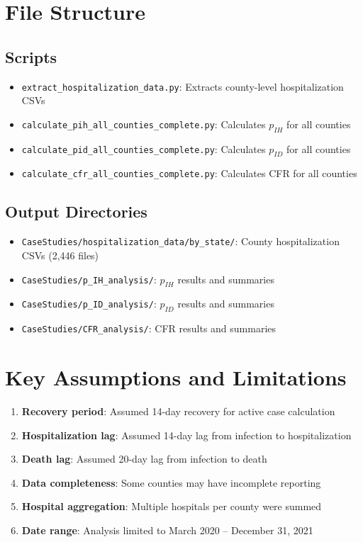 \documentclass[11pt]{article}
\begin{document}
\section{File Structure}

\subsection{Scripts}
\begin{itemize}
    \item \texttt{extract\_hospitalization\_data.py}: Extracts county-level hospitalization CSVs
    \item \texttt{calculate\_pih\_all\_counties\_complete.py}: Calculates $p_{IH}$ for all counties
    \item \texttt{calculate\_pid\_all\_counties\_complete.py}: Calculates $p_{ID}$ for all counties
    \item \texttt{calculate\_cfr\_all\_counties\_complete.py}: Calculates CFR for all counties
\end{itemize}

\subsection{Output Directories}
\begin{itemize}
    \item \texttt{CaseStudies/hospitalization\_data/by\_state/}: County hospitalization CSVs (2,446 files)
    \item \texttt{CaseStudies/p\_IH\_analysis/}: $p_{IH}$ results and summaries
    \item \texttt{CaseStudies/p\_ID\_analysis/}: $p_{ID}$ results and summaries
    \item \texttt{CaseStudies/CFR\_analysis/}: CFR results and summaries
\end{itemize}

\section{Key Assumptions and Limitations}

\begin{enumerate}
    \item \textbf{Recovery period}: Assumed 14-day recovery for active case calculation
    \item \textbf{Hospitalization lag}: Assumed 14-day lag from infection to hospitalization
    \item \textbf{Death lag}: Assumed 20-day lag from infection to death
    \item \textbf{Data completeness}: Some counties may have incomplete reporting
    \item \textbf{Hospital aggregation}: Multiple hospitals per county were summed
    \item \textbf{Date range}: Analysis limited to March 2020 -- December 31, 2021
\end{enumerate}
\end{document}
